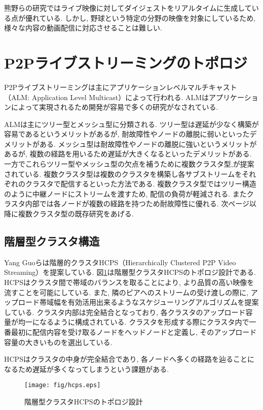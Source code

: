 熊野らの研究ではライブ映像に対してダイジェストをリアルタイムに生成している点が優れている. しかし, 野球という特定の分野の映像を対象にしているため, 様々な内容の動画配信に対応させることは難しい.

\section{P2Pライブストリーミングのトポロジ}
P2Pライブストリーミングは主にアプリケーションレベルマルチキャスト（ALM: Application Level Multicast）によって行われる. ALMはアプリケーションによって実現されるため開発が容易で多くの研究がなされている.

ALMは主にツリー型とメッシュ型に分類される. ツリー型は遅延が少なく構築が容易であるというメリットがあるが, 耐故障性やノードの離脱に弱いといったデメリットがある. メッシュ型は耐故障性やノードの離脱に強いというメリットがあるが, 複数の経路を用いるため遅延が大きくなるといったデメリットがある. 一方でこれらツリー型やメッシュ型の欠点を補うために複数クラスタ型\cite{dis},\cite{streamline}が提案されている. 複数クラスタ型は複数のクラスタを構築し各サブストリームをそれぞれのクラスタで配信するといった方法である. 複数クラスタ型ではツリー構造のように中継ノードにストリームを渡すため, 配信の負荷が軽減される. またクラスタ内部では各ノードが複数の経路を持つため耐故障性に優れる. 次ページ以降に複数クラスタ型の既存研究をあげる.

\newpage

\subsection{階層型クラスタ構造}
Yang Guoらは階層的クラスタHCPS（Hierarchically Clustered P2P Video Streaming）を提案している\cite{hcps}. 図\ref{fig:hcps}は階層型クラスタHCPSのトポロジ設計である. HCPSはクラスタ間で帯域のバランスを取ることにより, より品質の高い映像を流すことを可能にしている. また, 隣のピアへのストリームの受け渡しの際に, アップロード帯域幅を有効活用出来るようなスケジューリングアルゴリズムを提案している. クラスタ内部は完全結合となっており, 各クラスタのアップロード容量が均一になるように構成されている. クラスタを形成する際にクラスタ内で一番最初に配信内容を受け取るノードをヘッドノードと定義し, そのアップロード容量の大きいものを選出している.

HCPSはクラスタの中身が完全結合であり, 各ノードへ多くの経路を辿ることになるため遅延が多くなってしまうという課題がある.

\begin{figure}
  \centering
  \texttt{[image: fig/hcps.eps]}
  \caption{階層型クラスタHCPSのトポロジ設計}
  \label{fig:hcps}
\end{figure}

